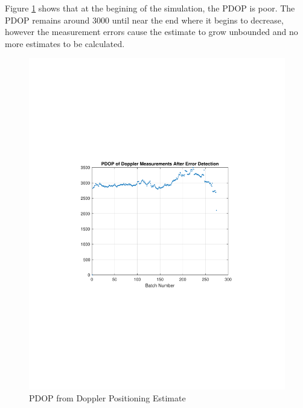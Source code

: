\documentclass[12pt]{report}
\begin{document}
Figure \ref{fig:USRPDoppler15minIridPDOP} shows that  at the begining of the simulation, the PDOP is poor. The PDOP remains around 3000 until near the end where it begins to decrease, however the measurement errors cause the estimate to grow unbounded and no more estimates to be calculated. 
\begin{figure}[h!]
    \centering
    \includegraphics[trim=1.2in 3.3in 1.75in 3.3in,clip,width=5in]
    {Irid_15min_USRP_DopplerPDOP.pdf}
    \caption{PDOP from Doppler Positioning Estimate}
    \label{fig:USRPDoppler15minIridPDOP}
\end{figure}
\end{document}
